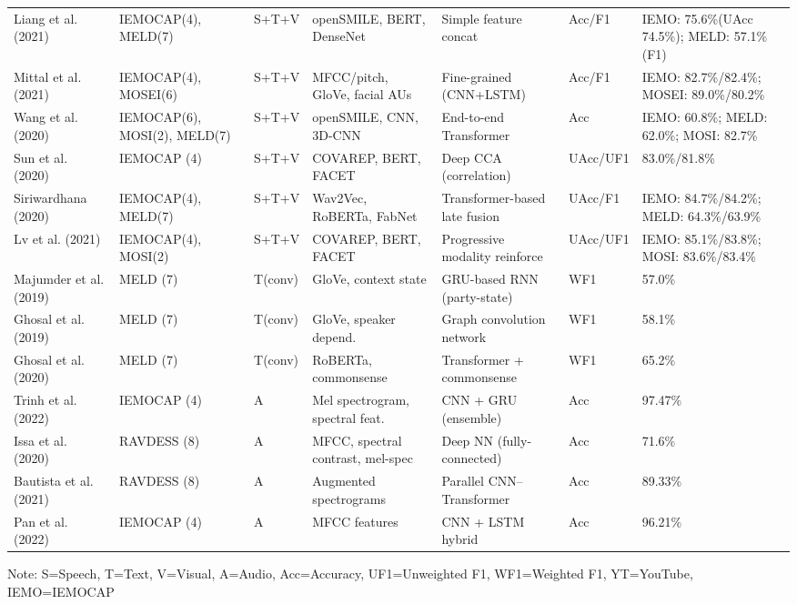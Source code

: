 \documentclass[12pt]{article}
\begin{document}
\begin{table}[p]
\begin{adjustbox}{width=\textwidth,center}
\begin{tabular}{@{}p{2.3cm}p{1.6cm}p{1.2cm}p{2.4cm}p{2.3cm}p{1.1cm}p{2.1cm}@{}}
Liang et al. (2021) & IEMOCAP(4), MELD(7) & S+T+V & openSMILE, BERT, DenseNet & Simple feature concat & Acc/F1 & IEMO: 75.6\%(UAcc 74.5\%); MELD: 57.1\%(F1) \\
Mittal et al. (2021) & IEMOCAP(4), MOSEI(6) & S+T+V & MFCC/pitch, GloVe, facial AUs & Fine-grained (CNN+LSTM) & Acc/F1 & IEMO: 82.7\%/82.4\%; MOSEI: 89.0\%/80.2\% \\
Wang et al. (2020) & IEMOCAP(6), MOSI(2), MELD(7) & S+T+V & openSMILE, CNN, 3D-CNN & End-to-end Transformer & Acc & IEMO: 60.8\%; MELD: 62.0\%; MOSI: 82.7\% \\
Sun et al. (2020) & IEMOCAP (4) & S+T+V & COVAREP, BERT, FACET & Deep CCA (correlation) & UAcc/UF1 & 83.0\%/81.8\% \\
Siriwardhana (2020) & IEMOCAP(4), MELD(7) & S+T+V & Wav2Vec, RoBERTa, FabNet & Transformer-based late fusion & UAcc/F1 & IEMO: 84.7\%/84.2\%; MELD: 64.3\%/63.9\% \\
Lv et al. (2021) & IEMOCAP(4), MOSI(2) & S+T+V & COVAREP, BERT, FACET & Progressive modality reinforce & UAcc/UF1 & IEMO: 85.1\%/83.8\%; MOSI: 83.6\%/83.4\% \\
Majumder et al. (2019) & MELD (7) & T(conv) & GloVe, context state & GRU-based RNN (party-state) & WF1 & 57.0\% \\
Ghosal et al. (2019) & MELD (7) & T(conv) & GloVe, speaker depend. & Graph convolution network & WF1 & 58.1\% \\
Ghosal et al. (2020) & MELD (7) & T(conv) & RoBERTa, commonsense & Transformer + commonsense & WF1 & 65.2\% \\
Trinh et al. (2022) & IEMOCAP (4) & A & Mel spectrogram, spectral feat. & CNN + GRU (ensemble) & Acc & 97.47\% \\
Issa et al. (2020) & RAVDESS (8) & A & MFCC, spectral contrast, mel-spec & Deep NN (fully-connected) & Acc & 71.6\% \\
Bautista et al. (2021) & RAVDESS (8) & A & Augmented spectrograms & Parallel CNN–Transformer & Acc & 89.33\% \\
Pan et al. (2022) & IEMOCAP (4) & A & MFCC features & CNN + LSTM hybrid & Acc & 96.21\% \\
\bottomrule
\end{tabular}
\end{adjustbox}
\vspace{1mm}
\begin{flushleft}
{\tiny Note: S=Speech, T=Text, V=Visual, A=Audio, Acc=Accuracy, UF1=Unweighted F1, WF1=Weighted F1, YT=YouTube, IEMO=IEMOCAP}
\end{flushleft}
\end{table}
\clearpage
\end{document}
